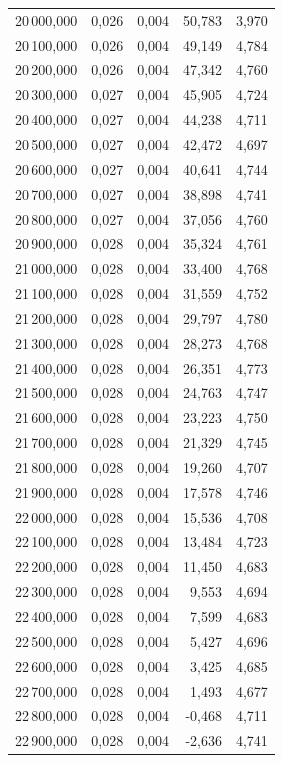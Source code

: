 \begin{longtable}{rrrrr}
20\,000,000 & 0,026 & 0,004 & 50,783 & 3,970\\
20\,100,000 & 0,026 & 0,004 & 49,149 & 4,784\\
20\,200,000 & 0,026 & 0,004 & 47,342 & 4,760\\
20\,300,000 & 0,027 & 0,004 & 45,905 & 4,724\\
20\,400,000 & 0,027 & 0,004 & 44,238 & 4,711\\
20\,500,000 & 0,027 & 0,004 & 42,472 & 4,697\\
20\,600,000 & 0,027 & 0,004 & 40,641 & 4,744\\
20\,700,000 & 0,027 & 0,004 & 38,898 & 4,741\\
20\,800,000 & 0,027 & 0,004 & 37,056 & 4,760\\
20\,900,000 & 0,028 & 0,004 & 35,324 & 4,761\\
21\,000,000 & 0,028 & 0,004 & 33,400 & 4,768\\
21\,100,000 & 0,028 & 0,004 & 31,559 & 4,752\\
21\,200,000 & 0,028 & 0,004 & 29,797 & 4,780\\
21\,300,000 & 0,028 & 0,004 & 28,273 & 4,768\\
21\,400,000 & 0,028 & 0,004 & 26,351 & 4,773\\
21\,500,000 & 0,028 & 0,004 & 24,763 & 4,747\\
21\,600,000 & 0,028 & 0,004 & 23,223 & 4,750\\
21\,700,000 & 0,028 & 0,004 & 21,329 & 4,745\\
21\,800,000 & 0,028 & 0,004 & 19,260 & 4,707\\
21\,900,000 & 0,028 & 0,004 & 17,578 & 4,746\\
22\,000,000 & 0,028 & 0,004 & 15,536 & 4,708\\
22\,100,000 & 0,028 & 0,004 & 13,484 & 4,723\\
22\,200,000 & 0,028 & 0,004 & 11,450 & 4,683\\
22\,300,000 & 0,028 & 0,004 & 9,553 & 4,694\\
22\,400,000 & 0,028 & 0,004 & 7,599 & 4,683\\
22\,500,000 & 0,028 & 0,004 & 5,427 & 4,696\\
22\,600,000 & 0,028 & 0,004 & 3,425 & 4,685\\
22\,700,000 & 0,028 & 0,004 & 1,493 & 4,677\\
22\,800,000 & 0,028 & 0,004 & -0,468 & 4,711\\
22\,900,000 & 0,028 & 0,004 & -2,636 & 4,741\\

\end{longtable}
